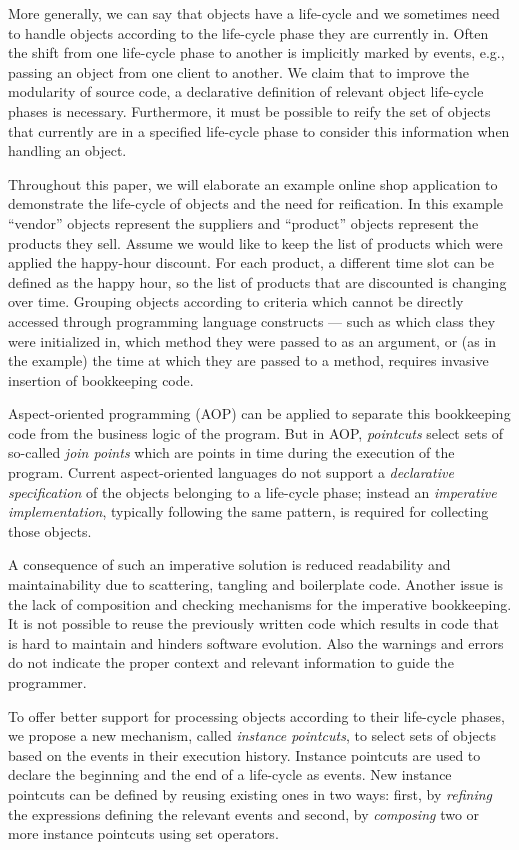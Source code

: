 More generally, we can say that objects have a life-cycle and we sometimes need to handle objects according to the life-cycle phase they are currently in.
Often the shift from one life-cycle phase to another is implicitly marked by events, e.g., passing an object from one client to another.
We claim that to improve the modularity of source code, a declarative definition of relevant object life-cycle phases is necessary.
Furthermore, it must be possible to reify the set of objects that currently are in a specified life-cycle phase to consider this information when handling an object.

Throughout this paper, we will elaborate an example online shop application to demonstrate the life-cycle of objects and the need for reification.
In this example ``vendor'' objects represent the suppliers and ``product'' objects represent the products they sell.
Assume we would like to keep the list of products which were applied the happy-hour discount. For each product, a different time slot can be defined as the happy hour, so the list of products that are discounted is changing over time. Grouping objects according to criteria which cannot be directly accessed through programming language constructs --- such as which class they were initialized in, which method they were passed to as an argument, or (as in the example) the time at which they are passed to a method, requires invasive insertion of bookkeeping code.

Aspect-oriented programming (AOP) can be applied to separate this bookkeeping code from the business logic of the program. But in AOP, \emph{pointcuts} select sets of so-called \emph{join points} which are points in time during the execution of the program. Current aspect-oriented languages do not support a \emph{declarative specification} of the objects belonging to a life-cycle phase; instead an \emph{imperative implementation}, typically following the same pattern, is required for collecting those objects.

A consequence of such an imperative solution is reduced readability and maintainability due to scattering, tangling and boilerplate code. Another issue is the lack of composition and checking mechanisms for the imperative bookkeeping. It is not possible to reuse the previously written code which results in code that is hard to maintain and hinders software evolution. Also the warnings and errors do not indicate the proper context and relevant information to guide the programmer.


To offer better support for processing objects according to their life-cycle phases, we propose a new mechanism, called \emph{instance pointcuts}, to select sets of objects based on the events in their execution history.
Instance pointcuts are used to declare the beginning and the end of a life-cycle as events.
New instance pointcuts can be defined by reusing existing ones in two ways: first, by \emph{refining} the expressions defining the relevant events and second, by \emph{composing }two or more instance pointcuts using set operators.

